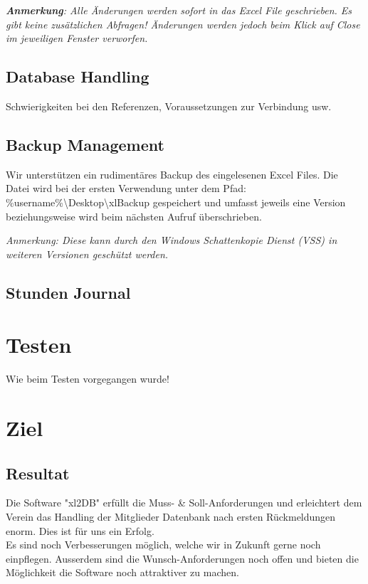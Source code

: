 \documentclass{article}
\begin{document}
\vspace{45mm}
\textit{\textbf{Anmerkung}: Alle Änderungen werden sofort in das Excel File geschrieben. Es gibt keine zusätzlichen Abfragen! Änderungen werden jedoch beim Klick auf Close im jeweiligen Fenster verworfen.}

	\newpage
\subsection{Database Handling}
Schwierigkeiten bei den Referenzen, Voraussetzungen zur Verbindung usw.

\subsection{Backup Management}
Wir unterstützen ein rudimentäres Backup des eingelesenen Excel Files. Die Datei wird bei der ersten Verwendung unter dem Pfad: \%username\%\textbackslash Desktop\textbackslash xlBackup gespeichert und umfasst jeweils eine Version beziehungsweise wird beim nächsten Aufruf überschrieben.

\textit{Anmerkung: Diese kann durch den Windows Schattenkopie Dienst (VSS) in weiteren Versionen geschützt werden.}

\subsection{Stunden Journal}

\section{Testen}
Wie beim Testen vorgegangen wurde!

\newpage

\section{Ziel}
\subsection{Resultat}

Die Software "xl2DB" erfüllt die Muss- \& Soll-Anforderungen und erleichtert dem Verein das Handling der Mitglieder Datenbank nach ersten Rückmeldungen enorm. Dies ist für uns ein Erfolg. \\
Es sind noch Verbesserungen möglich, welche wir in Zukunft gerne noch einpflegen. Ausserdem sind die Wunsch-Anforderungen noch offen und bieten die Möglichkeit die Software noch attraktiver zu machen.
\end{document}
